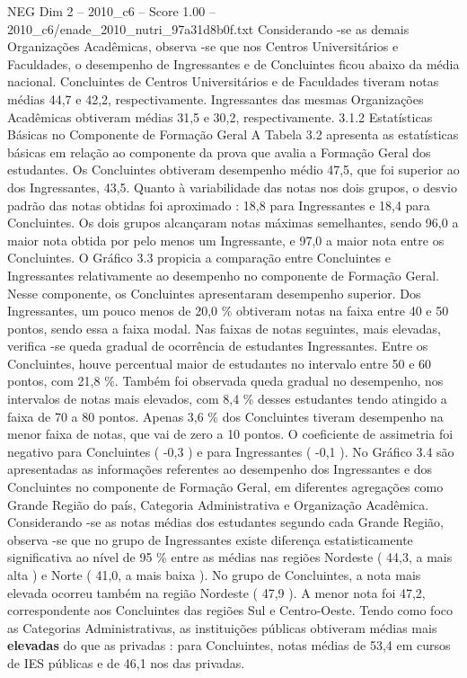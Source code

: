 \begin{textsample}{NEG Dim 2 – 2010\_c6 – Score 1.00 – 2010\_c6/enade\_2010\_nutri\_97a31d8b0f.txt}
Considerando -se as demais Organizações Acadêmicas, observa -se que nos Centros Universitários e Faculdades, o desempenho de Ingressantes e de Concluintes ficou abaixo da média nacional.
Concluintes de Centros Universitários e de Faculdades tiveram notas médias 44,7 e 42,2, respectivamente.
Ingressantes das mesmas Organizações Acadêmicas obtiveram médias 31,5 e 30,2, respectivamente. 3.1.2 Estatísticas Básicas no Componente de Formação Geral A Tabela 3.2 apresenta as estatísticas básicas em relação ao componente da prova que avalia a Formação Geral dos estudantes.
Os Concluintes obtiveram desempenho médio 47,5, que foi superior ao dos Ingressantes, 43,5.
Quanto à variabilidade das notas nos dois grupos, o desvio padrão das notas obtidas foi aproximado : 18,8 para Ingressantes e 18,4 para Concluintes.
Os dois grupos alcançaram notas máximas semelhantes, sendo 96,0 a maior nota obtida por pelo menos um Ingressante, e 97,0 a maior nota entre os Concluintes.
O Gráfico 3.3 propicia a comparação entre Concluintes e Ingressantes relativamente ao desempenho no componente de Formação Geral.
Nesse componente, os Concluintes apresentaram desempenho superior.
Dos Ingressantes, um pouco menos de 20,0 \% obtiveram notas na faixa entre 40 e 50 pontos, sendo essa a faixa modal.
Nas faixas de notas seguintes, mais elevadas, verifica -se queda gradual de ocorrência de estudantes Ingressantes.
Entre os Concluintes, houve percentual maior de estudantes no intervalo entre 50 e 60 pontos, com 21,8 \%.
Também foi observada queda gradual no desempenho, nos intervalos de notas mais elevados, com 8,4 \% desses estudantes tendo atingido a faixa de 70 a 80 pontos.
Apenas 3,6 \% dos Concluintes tiveram desempenho na menor faixa de notas, que vai de zero a 10 pontos.
O coeficiente de assimetria foi negativo para Concluintes ( -0,3 ) e para Ingressantes ( -0,1 ).
No Gráfico 3.4 são apresentadas as informações referentes ao desempenho dos Ingressantes e dos Concluintes no componente de Formação Geral, em diferentes agregações como Grande Região do país, Categoria Administrativa e Organização Acadêmica.
Considerando -se as notas médias dos estudantes segundo cada Grande Região, observa -se que no grupo de Ingressantes existe diferença estatisticamente significativa ao nível de 95 \% entre as médias nas regiões Nordeste ( 44,3, a mais alta ) e Norte ( 41,0, a mais baixa ).
No grupo de Concluintes, a nota mais elevada ocorreu também na região Nordeste ( 47,9 ).
A menor nota foi 47,2, correspondente aos Concluintes das regiões Sul e Centro-Oeste.
Tendo como foco as Categorias Administrativas, as instituições públicas obtiveram médias mais \textbf{elevadas} do que as privadas : para Concluintes, notas médias de 53,4 em cursos de IES públicas e de 46,1 nos das privadas.

\end{textsample}
